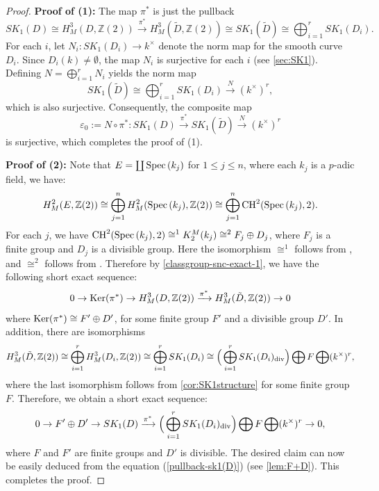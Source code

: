 \documentclass[12pt]{amsart}
\theoremstyle{remark}
\renewcommand{\1}{{\mathbb{S}}}
\newcommand{\Ker}{{\rm Ker}}
\newcommand{\CH}{{\rm CH}}
\newcommand{\Spec}{{\rm Spec \,}}
\newcommand{\<}{\langle}
\renewcommand{\>}{\rangle}
\newcommand{\dv}{{\rm div}}
\begin{document}
\begin{proof}
\noindent \textbf{Proof of (1):} The map $\pi^*$ is just the pullback 
\begin{equation}
    SK_{1}(D) \cong H_{M}^{3}(D, \mathbb{Z}(2)) \xrightarrow{\pi^{*}} H_{M}^{3}(\tilde{D}, \mathbb{Z}(2)) \cong SK_{1}(\tilde{D}) \cong \bigoplus_{i=1}^{r} SK_{1}(D_{i}).
\end{equation}
For each $i$, let $N_{i} \colon SK_{1}(D_{i}) \to k^{\times}$ denote the norm map for the smooth curve $D_{i}$. Since $D_{i}(k) \neq \emptyset$, the map $N_{i}$ is surjective for each $i$ (see \ref{sec:SK1}). Defining $N = \bigoplus_{i=1}^{r} N_{i}$ yields the norm map
\[
SK_{1}(\tilde{D}) \cong \bigoplus_{i=1}^{r} SK_{1}(D_{i}) \xrightarrow{N} (k^{\times})^{r},
\]
which is also surjective. Consequently, the composite map
\[
\varepsilon_0 := N \circ \pi^{*} \colon SK_{1}(D) \xrightarrow{\pi^{*}} SK_{1}(\tilde{D}) \xrightarrow{N} (k^{\times})^{r}
\]
is surjective, which completes the proof of (1).



\noindent \textbf{Proof of (2):}  Note that $E = \coprod \Spec(k_{j})$ for $1 \leq j \leq n$, where each $k_{j}$ is a $p$-adic field, we have:
\[
H_{M}^{2}(E, \mathbb{Z}(2)) \cong \bigoplus_{j = 1}^{n} H_{M}^{2}(\Spec(k_{j}), \mathbb{Z}(2)) \cong \bigoplus_{j = 1}^{n} \CH^{2}(\Spec(k_{j}), 2).
\]
For each $j$, we have $\CH^{2}(\Spec(k_{j}), 2) \cong^{1} K^{M}_{2}(k_{j}) \cong^{2} F_{j} \oplus D_{j}$, where $F_{j}$ is a finite group and $D_{j}$ is a divisible group. Here the isomorphism $\cong^{1}$ follows from \cite[Theorem 5.1]{MVW}, and $\cong^{2}$ follows from \cite[Chapter VI Proposition 7.1]{Wei}.  Therefore by \eqref{classgroup-snc-exact-1}, we have the following short exact sequence:
\begin{equation}
    0 \rightarrow \Ker(\pi^{\ast}) \rightarrow H_{M}^{3}(D, \mathbb{Z}(2)) \xrightarrow{\pi^{\ast}} H_{M}^{3}(\Tilde{D} , \mathbb{Z}(2)) \rightarrow 0 
\end{equation}
where $\Ker(\pi^{\ast}) \cong F' \oplus D'$, for some finite group $F'$ and a divisible group $D'$. In addition, there are isomorphisms
\[
H_{M}^{3}(\Tilde{D}, \mathbb{Z}(2)) \cong \bigoplus_{i=1}^{r} H_{M}^{3}(D_{i}, \mathbb{Z}(2)) \cong \bigoplus_{i=1}^{r} SK_{1}(D_{i}) \cong \Big (\bigoplus_{i=1}^{r}SK_1(D_{i})_{\dv} \Big)\bigoplus F \bigoplus (k^{\times})^{r},
\]
where the last isomorphism follows from \autoref{cor:SK1structure} for some finite group $F$. Therefore, we obtain a short exact sequence:
\begin{equation}\label{pullback-sk1(D)}
0 \rightarrow F' \oplus D' \rightarrow SK_{1}(D) \xrightarrow{\pi^{\ast}} \Big (\bigoplus_{i=1}^{r}SK_1(D_{i})_{\dv} \Big)\bigoplus F \bigoplus (k^{\times})^{r}\rightarrow 0,
\end{equation}
where $F$ and $F'$ are finite groups and $D'$ is divisible. The desired claim can now be easily deduced from the equation (\ref{pullback-sk1(D)}) (see \autoref{lem:F+D}). This completes the proof.

\end{proof}
\end{document}
